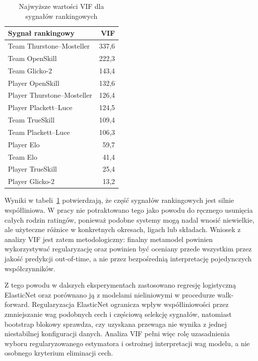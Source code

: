 \begin{table}[H]
    \centering
    \caption{Najwyższe wartości VIF dla sygnałów rankingowych}
    \label{tab:rating_signal_vif}
    \begin{tabular}{lr}
        \toprule
        Sygnał rankingowy & VIF \\
        \midrule
        Team Thurstone--Mosteller & 337{,}6 \\
        Team OpenSkill & 222{,}3 \\
        Team Glicko-2 & 143{,}4 \\
        Player OpenSkill & 132{,}6 \\
        Player Thurstone--Mosteller & 126{,}4 \\
        Player Plackett--Luce & 124{,}5 \\
        Team TrueSkill & 109{,}4 \\
        Team Plackett--Luce & 106{,}3 \\
        Player Elo & 59{,}7 \\
        Team Elo & 41{,}4 \\
        Player TrueSkill & 25{,}4 \\
        Player Glicko-2 & 13{,}2 \\
        \bottomrule
    \end{tabular}
\end{table}

Wyniki w tabeli~\ref{tab:rating_signal_vif} potwierdzają, że część sygnałów rankingowych jest silnie współliniowa. W pracy nie potraktowano tego jako powodu do ręcznego usunięcia całych rodzin ratingów, ponieważ podobne systemy mogą nadal wnosić niewielkie, ale użyteczne różnice w konkretnych okresach, ligach lub składach. Wniosek z analizy VIF jest zatem metodologiczny: finalny metamodel powinien wykorzystywać regularyzację oraz powinien być oceniany przede wszystkim przez jakość predykcji out-of-time, a nie przez bezpośrednią interpretację pojedynczych współczynników.

Z tego powodu w dalszych eksperymentach zastosowano regresję logistyczną ElasticNet oraz porównano ją z modelami nieliniowymi w procedurze walk-forward. Regularyzacja ElasticNet ogranicza wpływ współliniowości przez zmniejszanie wag podobnych cech i częściową selekcję sygnałów, natomiast bootstrap blokowy sprawdza, czy uzyskana przewaga nie wynika z jednej niestabilnej konfiguracji danych. Analiza VIF pełni więc rolę uzasadnienia wyboru regularyzowanego estymatora i ostrożnej interpretacji wag modelu, a nie osobnego kryterium eliminacji cech.

